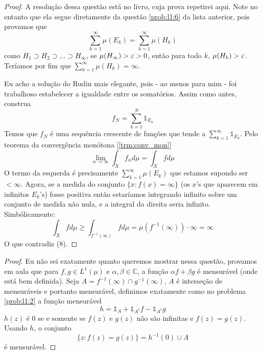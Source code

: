 \begin{problem}
    \label{prob:l2:6}
\end{problem}
\begin{proof}
    A resolução dessa questão está no livro, cuja prova repetirei aqui. Note no entanto que ela segue diretamente da questão \ref{prob:l1:6} da lista anterior, pois provamos 
    que 
    $$\sum_{k=1}^{\infty} \mu(E_k) = \sum_{k=1}^{\infty} \mu(H_k)$$
    como $H_1 \supset H_2 \supset \dots \supset H_\infty$, se $\mu(H_\infty) > \varepsilon > 0$, então para todo $k$, $\mu(H_k) > \varepsilon$. Teríamos por fim que $\sum_{k=1}^{\infty} \mu(H_k) = \infty$.

    Eu acho a solução do Rudin mais elegante, pois - ao menos para mim - foi trabalhoso estabelecer a igualdade entre os somatórios. Assim como antes, construa 
    $$f_N = \sum_{k=1}^{N} \mathds{1}_{E_k}$$
    Temos que $f_N$ é uma sequência crescente de funções que tende a $\sum_{k = 1}^{\infty} \mathds{1}_{E_k}$. Pelo teorema da convergência monótona [\ref{trm:conv_mon}]
    \begin{equation}
        \lim_{n\to\infty} \int_X f_n d\mu = \int_X f d\mu
    \end{equation}
    O termo da esquerda é precisamente $\sum_{k=1}^{\infty} \mu(E_k)$ que estamos supondo ser $ < \infty$. Agora, se a medida do conjunto $\{x : f(x) = \infty\}$ (os $x$'s que aparecem em infinitos $E_k$'s) 
    fosse positiva então estaríamos integrando infinito sobre um conjunto de medida não nula, e a integral da direita seria infinito. Simbólicamente:
    $$\int_X f d\mu \geq \int_{f^{-1}(\infty)} fd\mu = \mu(f^{-1}(\infty)) \cdot \infty = \infty$$
    O que contradiz (8).
\end{proof}

\begin{problem}
    \label{prob:l2:7}
\end{problem}
\begin{proof}
    Eu não sei exatamente quanto queremos mostrar nessa questão, provamos em aula que para $f,g \in L^1(\mu)$ e $\alpha,\beta \in \mathbb{C}$, 
    a função $\alpha f + \beta g$ é mensurável (onde está bem definida). Seja $A = f^{-1}(\infty) \cap g^{-1}(\infty)$, $A$ é interseção de mensuráveis
    e portanto mensurável, definimos exatamente como no problema \ref{prob:l1:2} a função mensurável 
    $$h = \mathds{1}_A + \mathds{1}_{A^c}f - \mathds{1}_{A^c}g$$
    $h(z)$ é $0$ se e somente se $f(z)$ e $g(z)$ não são infinitas e $f(z) = g(z)$. Usando $h$, o conjunto 
    $$\{z : f(z) = g(z)\} = h^{-1}(0) \cup A$$
    é mensurável.
\end{proof}